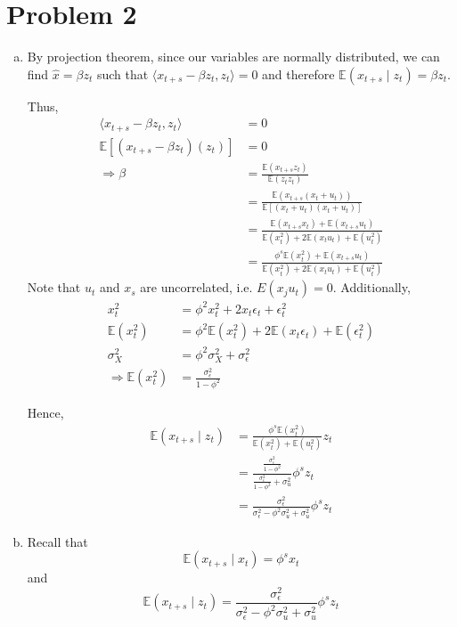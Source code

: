 \documentclass[12pt]{article}
\theoremstyle{definition}
\newcommand\E{\mathbb{E}}
\newcommand{\inp}[2]{\langle #1, #2 \rangle}
\begin{document}
\section*{Problem 2}
\begin{enumerate}[(a)]
	\item
	
		By projection theorem, since our variables are normally distributed, we can find $\hat{x} = \beta z_t$ such that $\inp{x_{t+s}-\beta z_t}{z_t} =0$ and therefore $\E(x_{t+s}\mid z_t)=\beta z_t$.
	
	Thus,
	\begin{align*}
	\inp{x_{t+s}-\beta z_t}{z_t}& = 0\\
	 \E[({x_{t+s}-\beta z_t})({z_t})] &=0 \\
	\Rightarrow \beta & = \frac{\E(x_{t+s}z_t)}{\E(z_{t}z_t)} \\
	& = \frac{\E(x_{t+s}(x_t+u_t))}{\E[(x_t+u_t)(x_t+u_t)]} \\
		& = \frac{\E(x_{t+s}x_t)+\E(x_{t+s}u_t)}{\E(x_t^2)+2\E(x_tu_t)+\E(u_t^2)} \\
		& = \frac{\phi^s\E(x_{t}^2)+\E(x_{t+s}u_t)}{\E(x_t^2)+2\E(x_tu_t)+\E(u_t^2)}
	\end{align*}
		Note that $u_t$ and $x_s$ are uncorrelated, i.e. $E(x_{j}u_t)=0$. Additionally, 
	\begin{align*}
	x_{t}^2 &= \phi^2x_{t}^2 +2x_{t}\epsilon_t + \epsilon_t^2\\
	\E(x_{t}^2)& = \phi^2\E(x_{t}^2) +2\E(x_{t}\epsilon_t) + \E(\epsilon_t^2) \\
	\sigma_X^2&= \phi^2 \sigma_X^2 + \sigma_\epsilon^2\\
	\Rightarrow \E(x_{t}^2)& = \frac{\sigma_\epsilon^2}{1-\phi^2}
	\end{align*}
	
	Hence,
	\begin{align*}
	\E(x_{t+s}\mid z_t) & = \frac{\phi^s\E(x_{t}^2)}{\E(x_t^2)+\E(u_t^2)}z_t \\
	& = \frac{\frac{\sigma_\epsilon^2}{1-\phi^2}}{\frac{\sigma_\epsilon^2}{1-\phi^2}+\sigma_u^2}\phi^sz_t \\
	& = \frac{\sigma_\epsilon^2}{\sigma_\epsilon^2-\phi^2\sigma_u^2 + \sigma_u^2}\phi^sz_t
	\end{align*}
	
	\item
	
	Recall that
	\[
	\E(x_{t+s}\mid x_t) = \phi^s x_t
	\]
	and
	\[
	\E(x_{t+s}\mid z_t) = \frac{\sigma_\epsilon^2}{\sigma_\epsilon^2-\phi^2\sigma_u^2 + \sigma_u^2}\phi^sz_t
	\]
	

\end{enumerate}
\end{document}
